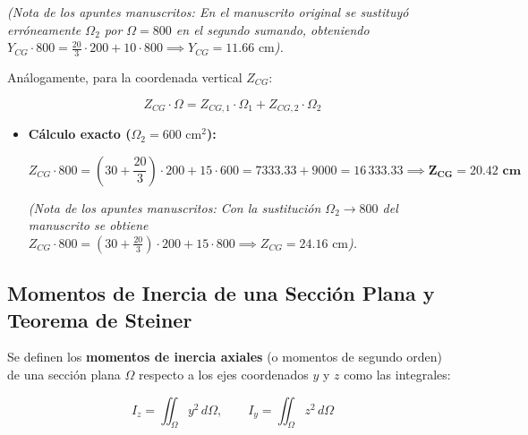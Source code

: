 {\begin{itemize}
              \textit{(Nota de los apuntes manuscritos: En el manuscrito original se sustituyó erróneamente $\Omega_2$ por $\Omega = 800$ en el segundo sumando, obteniendo $Y_{CG} \cdot 800 = \frac{20}{3}\cdot 200 + 10 \cdot 800 \implies Y_{CG} = 11.66\text{ cm}$).}

    \end{itemize}



    Análogamente, para la coordenada vertical $Z_{CG}$:

    \begin{equation}
        Z_{CG} \cdot \Omega = Z_{CG,1} \cdot \Omega_1 + Z_{CG,2} \cdot \Omega_2
\end{equation}

    \begin{itemize}

        \item \textbf{Cálculo exacto ($\Omega_2 = 600\text{ cm}^2$):}

              \begin{equation}
                  Z_{CG} \cdot 800 = \left(30 + \frac{20}{3}\right) \cdot 200 + 15 \cdot 600 = 7333.33 + 9000 = 16\,333.33 \implies \mathbf{Z_{CG} = 20.42\text{ cm}}
\end{equation}

              \textit{(Nota de los apuntes manuscritos: Con la sustitución $\Omega_2 \to 800$ del manuscrito se obtiene $Z_{CG} \cdot 800 = \left(30 + \frac{20}{3}\right) \cdot 200 + 15 \cdot 800 \implies Z_{CG} = 24.16\text{ cm}$).}

    \end{itemize}

}




\subsection{Momentos de Inercia de una Sección Plana y Teorema de Steiner}



Se definen los \textbf{momentos de inercia axiales} (o momentos de segundo orden) de una sección plana $\Omega$ respecto a los ejes coordenados $y$ y $z$ como las integrales:

\begin{equation}
    I_z = \iint_{\Omega} y^2 \, d\Omega, \qquad I_y = \iint_{\Omega} z^2 \, d\Omega
\end{equation}

